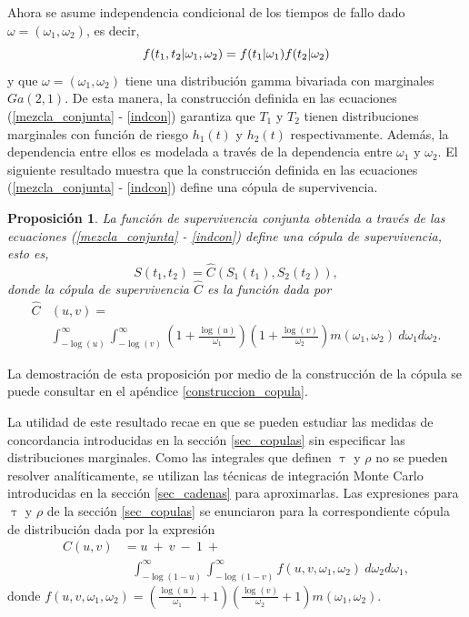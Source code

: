 \documentclass[11pt,a4paper]{article}
\newtheorem{proposition}{Proposición}[subsection]
\begin{document}
Ahora se asume independencia condicional de los tiempos de fallo dado $\omega = (\omega_1, \omega_2)$, es decir,
\begin{equation} \label{indcon}
f(t_1, t_2 | \omega_1, \omega_2) = f(t_1 | \omega_1)f(t_2 | \omega_2)\\
\end{equation}
y que $\omega = (\omega_1, \omega_2)$ tiene una distribución gamma bivariada con marginales $Ga(2, 1).$ De esta manera, la construcción definida en las ecuaciones (\ref{mezcla_conjunta} - \ref{indcon}) garantiza que $T_1$ y $T_2$ tienen distribuciones marginales con función de riesgo $h_1(t)$ y $h_2(t)$ respectivamente. Además, la dependencia entre ellos es modelada a través de la dependencia entre $\omega_1$ y $\omega_2$. El siguiente resultado muestra que la construcción definida en las ecuaciones (\ref{mezcla_conjunta} - \ref{indcon}) define una cópula de supervivencia.

\begin{proposition}
La función de supervivencia conjunta obtenida a través de las ecuaciones (\ref{mezcla_conjunta} - \ref{indcon}) define una cópula de supervivencia, esto es, $$S(t_1, t_2) = \widehat{C}(S_1(t_1), S_2(t_2)),$$ donde la cópula de supervivencia $\widehat{C}$ es la función dada por
\begin{align} \label{copula_modelo}
\widehat{C}&(u, v) = \nonumber \\
& \int_{-\log (u)}^\infty \int_{-\log (v)}^\infty \left(1 + \frac{\log(u)}{\omega_1}\right)\left(1 + \frac{\log(v)}{\omega_2}\right) m(\omega_1, \omega_2) \ d\omega_1 d \omega_2.
\end{align}
\end{proposition}
La demostración de esta proposición por medio de la construcción de la cópula se puede consultar en el apéndice \ref{construccion_copula}.

La utilidad de este resultado recae en que se pueden estudiar las medidas de concordancia introducidas en la sección \ref{sec_copulas} sin especificar las distribuciones marginales. Como las integrales que definen $\uptau$ y $\rho$ no se pueden resolver analíticamente, se utilizan las técnicas de integración Monte Carlo introducidas en la sección \ref{sec_cadenas} para aproximarlas. Las expresiones para $\uptau$ y $\rho$ de la sección \ref{sec_copulas} se enunciaron para la correspondiente cópula de distribución dada por la expresión
\begin{align}\label{copula_distribucion}
C(u, v) &= u \ + \ v \ - \ 1 \ +\nonumber\\ 
& \ \ \ \int_{-\log (1-u)}^\infty \int_{-\log (1-v)}^\infty f(u, v, \omega_1, \omega_2) \ d\omega_2 d\omega_1,
\end{align}
donde $f(u, v, \omega_1, \omega_2) = \left( \frac{\log (u)}{\omega_1}+1 \right) \left( \frac{\log (v)}{\omega_2}+1\right) m(\omega_1, \omega_2)$.
\end{document}
